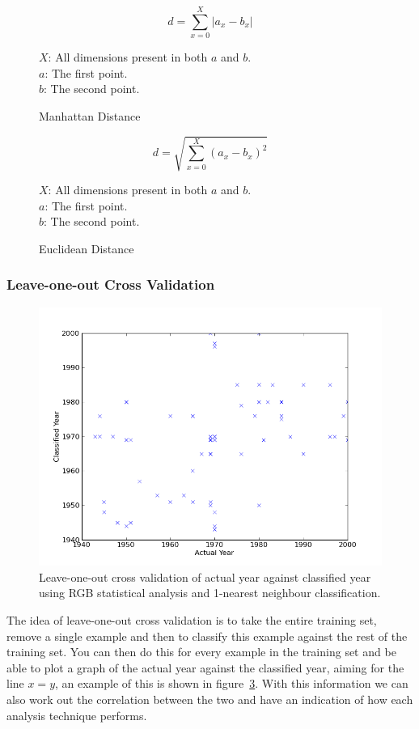 \documentclass[11pt,fleqn,twoside]{article}
\begin{document}
\begin{figure}[h]
\[
d = \sum^X_{x=0}{|a_x - b_x|}
\]

\(X\): All dimensions present in both \(a\) and \(b\).\\
\(a\): The first point.\\
\(b\): The second point.

\caption{Manhattan Distance}
\label{eq:manhattan}
\end{figure}

\begin{figure}[h]
\[
d = \sqrt{\sum^X_{x=0}{(a_x - b_x)^2}}
\]

\(X\): All dimensions present in both \(a\) and \(b\).\\
\(a\): The first point.\\
\(b\): The second point.
\caption{Euclidean Distance}
\label{eq:euclidean}
\end{figure}



\subsubsection{Leave-one-out Cross Validation}
\begin{figure}[h]
\includegraphics[scale=0.5]{img/validation-rgb-1nn.png}
\caption{Leave-one-out cross validation of actual year against classified year using RGB statistical analysis and
1-nearest neighbour classification.}
\label{fig:validation-rgb-1nn}
\end{figure}

The idea of leave-one-out cross validation is to take the entire training set, remove a single 
example and then to classify this example against the rest of the training set. You can then do
this for every example in the training set and be able to plot a graph of the actual year against
the classified year, aiming for the line $x=y$, an example of this is shown in 
figure~\ref{fig:validation-rgb-1nn}. With this information we can also work out the correlation 
between the two and have an indication of how each analysis technique performs.
\end{document}
